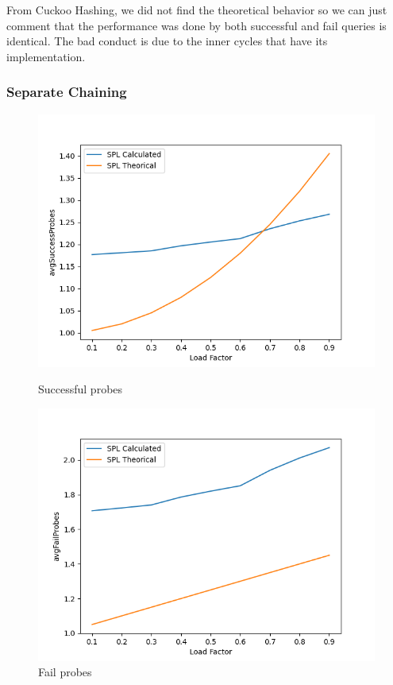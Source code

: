 \documentclass{article}
\begin{document}
    From Cuckoo Hashing, we did not find the theoretical behavior so we can just comment that the performance was done by both successful and fail queries is identical. The bad conduct is due to the inner cycles that have its implementation.
    
    \subsubsection*{Separate Chaining}

        \begin{figure}[H]
          \includegraphics[width=\linewidth]{images/loadFactor_vs_avgSuccessProbes_SPL.png}
          \caption{Successful probes}\label{fig:plot12}
        \endminipage\hfill
          \includegraphics[width=\linewidth]{images/loadFactor_vs_avgFailProbes_SPL.png}
          \caption{Fail probes}\label{fig:plot13}
        \endminipage
    \end{figure}
\end{document}
